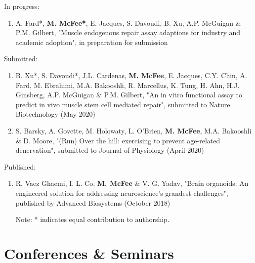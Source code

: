 \documentclass[letterpaper]{article}
\begin{document}
In progress:
\begin{enumerate}
\item A. Fard*, \textbf{M. McFee*}, E. Jacques, S. Davoudi, B. Xu, A.P. McGuigan \& P.M. Gilbert, "Muscle endogenous repair assay adaptions for industry and academic adoption", in preparation for submission
\end{enumerate}

Submitted:
\begin{enumerate}
\item B. Xu*, S. Davoudi*, J.L. Cardenas, \textbf{M. McFee}, E. Jacques, C.Y. Chin, A. Fard, M. Ebrahimi, M.A. Bakooshli, R. Marcellus, K. Tung, H. Ahn, H.J. Ginsberg, A.P. McGuigan \& P.M. Gilbert, "An in vitro functional assay to predict in vivo muscle stem cell mediated repair", submitted to Nature Biotechnology (May 2020)

\item S. Barsky, A. Govette, M. Holowaty, L. O'Brien,  \textbf{M. McFee}, M.A. Bakooshli \& D. Moore, "(Run) Over the hill: exercising to prevent age-related denervation", submitted to Journal of Physiology (April 2020)
\end{enumerate}

Published:
\begin{enumerate}
    \item R. Vaez Ghaemi, I. L. Co, \textbf{M. McFee} \& V. G. Yadav, "Brain organoids: An engineered solution for addressing neuroscience's grandest challenges", published by Advanced Biosystems (October 2018)
    
    {\tiny Note: * indicates equal contribution to authorship.}
\end{enumerate}



\section*{\textbf{Conferences \& Seminars}}
\end{document}
